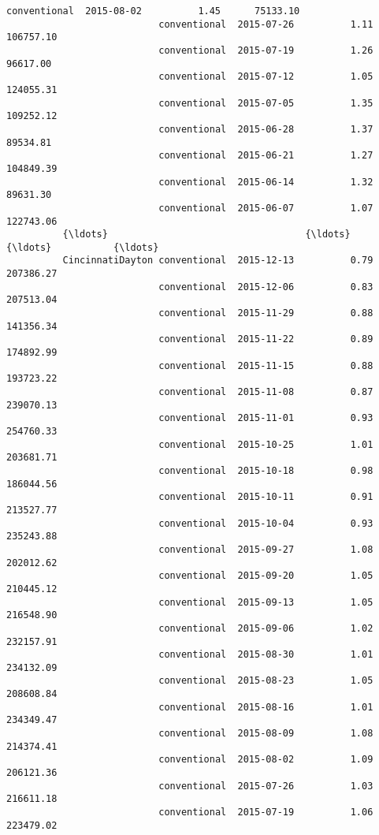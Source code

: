 \documentclass[11pt]{article}
\begin{document}
\begin{Verbatim}[commandchars=\\\{\}]
                           conventional  2015-08-02          1.45      75133.10   
                           conventional  2015-07-26          1.11     106757.10   
                           conventional  2015-07-19          1.26      96617.00   
                           conventional  2015-07-12          1.05     124055.31   
                           conventional  2015-07-05          1.35     109252.12   
                           conventional  2015-06-28          1.37      89534.81   
                           conventional  2015-06-21          1.27     104849.39   
                           conventional  2015-06-14          1.32      89631.30   
                           conventional  2015-06-07          1.07     122743.06   
          {\ldots}                                   {\ldots}           {\ldots}           {\ldots}   
          CincinnatiDayton conventional  2015-12-13          0.79     207386.27   
                           conventional  2015-12-06          0.83     207513.04   
                           conventional  2015-11-29          0.88     141356.34   
                           conventional  2015-11-22          0.89     174892.99   
                           conventional  2015-11-15          0.88     193723.22   
                           conventional  2015-11-08          0.87     239070.13   
                           conventional  2015-11-01          0.93     254760.33   
                           conventional  2015-10-25          1.01     203681.71   
                           conventional  2015-10-18          0.98     186044.56   
                           conventional  2015-10-11          0.91     213527.77   
                           conventional  2015-10-04          0.93     235243.88   
                           conventional  2015-09-27          1.08     202012.62   
                           conventional  2015-09-20          1.05     210445.12   
                           conventional  2015-09-13          1.05     216548.90   
                           conventional  2015-09-06          1.02     232157.91   
                           conventional  2015-08-30          1.01     234132.09   
                           conventional  2015-08-23          1.05     208608.84   
                           conventional  2015-08-16          1.01     234349.47   
                           conventional  2015-08-09          1.08     214374.41   
                           conventional  2015-08-02          1.09     206121.36   
                           conventional  2015-07-26          1.03     216611.18   
                           conventional  2015-07-19          1.06     223479.02   

\end{Verbatim}
\end{document}
